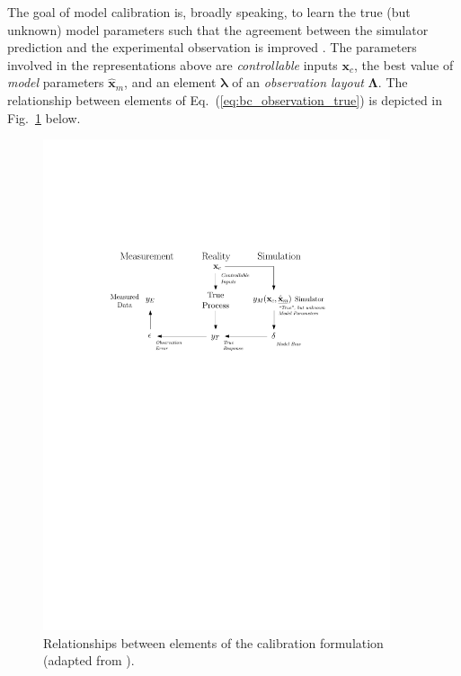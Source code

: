 The goal of model calibration is, broadly speaking, to learn the true (but unknown) model parameters such that the agreement between the simulator prediction and the experimental observation is improved \cite{Kennedy2001,Ling2014}.
The parameters involved in the representations above are \emph{controllable} inputs $\bm{x}_c$,
the best value of \emph{model} parameters $\hat{\bm{x}}_m$, and an element $\boldsymbol{\lambda}$ of an \emph{observation layout} $\boldsymbol{\Lambda}$.
The relationship between elements of Eq.~(\ref{eq:bc_observation_true}) is depicted in Fig.~\ref{fig:ch5_hm_error_model} below.
\begin{figure}[bth]	
	\centering
	\includegraphics[width=0.91\textwidth]{../figures/chapter5/figures/HMErrorModel}
	\caption[Relationships between elements of the calibration formulation.]{Relationships between elements of the calibration formulation (adapted from \cite{Huard2006}).}
	\label{fig:ch5_hm_error_model}
\end{figure}

